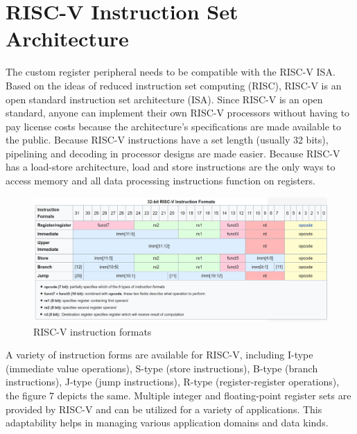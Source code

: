 \section{RISC-V Instruction Set Architecture}
The custom register peripheral needs to be compatible with the RISC-V ISA. Based on the ideas of reduced instruction set computing (RISC), RISC-V is an open standard instruction set architecture (ISA). Since RISC-V is an open standard, anyone can implement their own RISC-V processors without having to pay license costs because the architecture's specifications are made available to the public. Because RISC-V instructions have a set length (usually 32 bits), pipelining and decoding in processor designs are made easier. Because RISC-V has a load-store architecture, load and store instructions are the only ways to access memory and all data processing instructions function on registers. 
\newpage
\begin{figure}[h] %
  \centering
  \setlength{\abovecaptionskip}{0pt} %
  \setlength{\belowcaptionskip}{0pt} %
  \includegraphics[width=1.0\textwidth]{Image/RISC V.png} %
  \caption{RISC-V instruction formats}
  \label{Figure 1 : RISC-V instruction formats}
\end{figure}

A variety of instruction forms are available for RISC-V, including I-type (immediate value operations), S-type (store instructions), B-type (branch instructions), J-type (jump instructions), R-type (register-register operations), the figure 7 depicts the same. Multiple integer and floating-point register sets are provided by RISC-V and can be utilized for a variety of applications. This adaptability helps in managing various application domains and data kinds.


